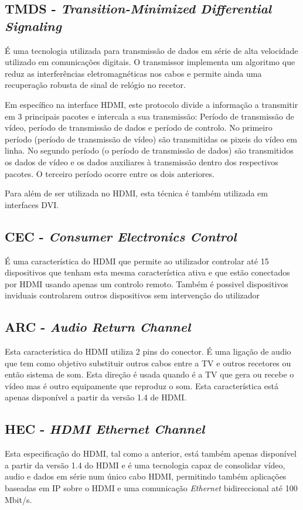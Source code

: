 \subsection{TMDS - \textit{Transition-Minimized Differential Signaling} } \label{batik} 
É uma tecnologia utilizada para transmissão de dados em série de alta velocidade utilizado em comunicações digitais. O transmissor implementa um algoritmo que reduz as interferências eletromagnéticas nos cabos e permite ainda uma recuperação robusta de sinal de relógio no recetor. 

Em específico na interface HDMI, este protocolo divide a informação a transmitir em 3 principais pacotes e intercala a sua transmissão: Período de transmissão de vídeo, período de transmissão de dados e período de controlo. No primeiro período (período de transmissão de vídeo) são transmitidas os pixeis do vídeo em linha. No segundo período (o período de transmissão de dados) são transmitidos os dados de vídeo e os dados auxiliares à transmissão dentro dos respectivos pacotes. O terceiro período ocorre entre os dois anteriores. 

Para além de ser utilizada no HDMI, esta técnica é também utilizada em interfaces DVI.
\subsection{CEC - \textit{Consumer Electronics Control} } \label{batik} 
É uma característica do HDMI que permite ao utilizador controlar até 15 dispositivos que tenham esta mesma característica ativa e que estão conectados por HDMI usando apenas um controlo remoto. Também é possivel dispositivos inviduais controlarem outros dispositivos sem intervenção do utilizador

\subsection{ARC - \textit{Audio Return Channel}  } \label{batik} 
Esta característica do HDMI utiliza 2 pins do conector. É uma ligação de audio que tem como objetivo substituir outros cabos entre a TV e outros recetores ou então sistema de som. Esta direção é usada quando é a TV que gera ou recebe o vídeo mas é outro equipamente que reproduz o som. Esta característica está apenas disponível a partir da versão 1.4 de HDMI.

\subsection{HEC - \textit{HDMI Ethernet Channel}  } \label{batik} 
Esta especificação do HDMI, tal como a anterior, está também apenas disponível a partir da versão 1.4 do HDMI e é uma tecnologia capaz de consolidar vídeo, audio e dados em série num único cabo HDMI, permitindo também aplicações baseadas em IP sobre o HDMI e uma comunicação \textit{Ethernet} bidireccional até 100 Mbit/s.

